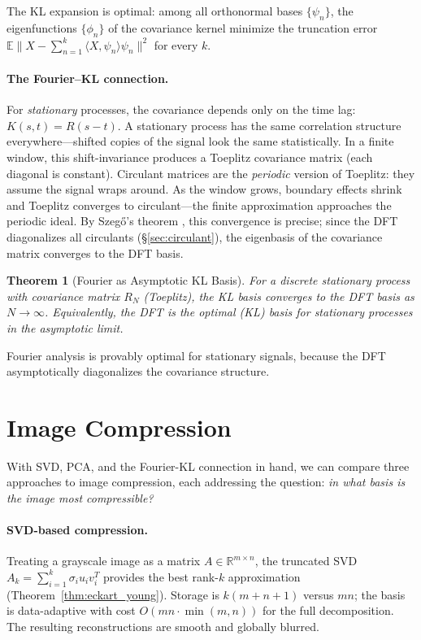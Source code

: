 \documentclass[12pt,a4paper]{report}
\theoremstyle{thms}
\newtheorem{theorem}{Theorem}[section]
\theoremstyle{defns}
\begin{document}
The KL expansion is optimal: among all orthonormal bases $\{\psi_n\}$, the eigenfunctions $\{\phi_n\}$ of the covariance kernel minimize the truncation error $\mathbb{E}\|X - \sum_{n=1}^{k} \langle X, \psi_n \rangle \psi_n\|^2$ for every $k$.

\paragraph{The Fourier--KL connection.} For \textit{stationary} processes, the covariance depends only on the time lag: $K(s, t) = R(s - t)$. A stationary process has the same correlation structure everywhere—shifted copies of the signal look the same statistically. In a finite window, this shift-invariance produces a Toeplitz covariance matrix (each diagonal is constant). Circulant matrices are the \textit{periodic} version of Toeplitz: they assume the signal wraps around. As the window grows, boundary effects shrink and Toeplitz converges to circulant—the finite approximation approaches the periodic ideal. By Szeg\H{o}'s theorem \cite{szego_orthogonal, gray_toeplitz}, this convergence is precise; since the DFT diagonalizes all circulants (\S\ref{sec:circulant}), the eigenbasis of the covariance matrix converges to the DFT basis.

\begin{theorem}[Fourier as Asymptotic KL Basis]
    For a discrete stationary process with covariance matrix $R_N$ (Toeplitz), the KL basis converges to the DFT basis as $N \to \infty$. Equivalently, the DFT is the optimal (KL) basis for stationary processes in the asymptotic limit.
\end{theorem}

Fourier analysis is provably optimal for stationary signals, because the DFT asymptotically diagonalizes the covariance structure.

\section{Image Compression}
\label{sec:image_compression}

With SVD, PCA, and the Fourier-KL connection in hand, we can compare three approaches to image compression, each addressing the question: \textit{in what basis is the image most compressible?}

\paragraph{SVD-based compression.} Treating a grayscale image as a matrix $A \in \mathbb{R}^{m \times n}$, the truncated SVD $A_k = \sum_{i=1}^{k} \sigma_i u_i v_i^T$ provides the best rank-$k$ approximation (Theorem~\ref{thm:eckart_young}). Storage is $k(m + n + 1)$ versus $mn$; the basis is data-adaptive with cost $O(mn \cdot \min(m, n))$ for the full decomposition. The resulting reconstructions are smooth and globally blurred.
\end{document}
